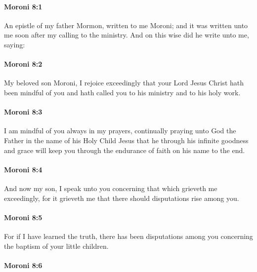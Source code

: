 		\paragraph{Moroni 8:1} %
			\label{MORONI-8-1}

			An epistle of my father Mormon, written to me Moroni;
			and it was written unto me soon after my calling to the ministry.
			And on this wise did he write unto me, saying:

		\paragraph{Moroni 8:2} %
			\label{MORONI-8-2}

			My beloved son Moroni, I rejoice exceedingly
			that your Lord Jesus Christ hath been mindful of you
			and hath called you to his ministry and to his holy work.

		\paragraph{Moroni 8:3} %
			\label{MORONI-8-3}

			I am mindful of you always in my prayers,
			continually praying unto God the Father in the name of his Holy Child Jesus
			that he through his infinite goodness and grace will keep you
			through the endurance of faith on his name to the end.

		\paragraph{Moroni 8:4} %
			\label{MORONI-8-4}

			And now my son, I speak unto you
			concerning that which grieveth me exceedingly,
			for it grieveth me that there should disputations rise among you.

		\paragraph{Moroni 8:5} %
			\label{MORONI-8-5}

			For if I have learned the truth,
			there has been disputations among you
			concerning the baptism of your little children.

		\paragraph{Moroni 8:6} %
			\label{MORONI-8-6}

